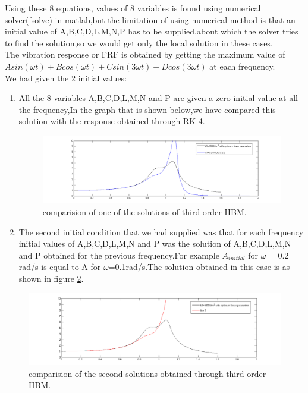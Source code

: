 Using these 8 equations, values of 8 variables is found using numerical solver(fsolve) in matlab,but the limitation of using numerical method is that an initial value of A,B,C,D,L,M,N,P has to be supplied,about which the solver tries to find the solution,so we would get only the local solution in these cases.\\
The vibration response or FRF is obtained by getting the maximum value of $Asin(\omega t)+Bcos(\omega t)+Csin(3\omega t)+Dcos(3\omega t) $ at each frequency.\\
We had given the 2 initial values:
\begin{enumerate}[1)]
\item All the 8 variables A,B,C,D,L,M,N and P are given a zero initial value at all the frequency,In the graph that is shown below,we have compared this solution with the response obtained through RK-4.

\begin{figure}[h!]
\includegraphics[width=\textwidth,height=0.5\textwidth]{"figures/nonlinearity_primaryymass_3rdorder_2"}
\caption{ comparision of one of the solutions of third order HBM.}
  \label{fig:hbm}
\end{figure}

\item The second initial condition that we had supplied was that for each frequency initial values of A,B,C,D,L,M,N and P was the solution of A,B,C,D,L,M,N and P obtained for the previous frequency.For example $A_{initial}$ for $\omega$ = 0.2 rad/s is equal to A for $\omega$=0.1rad/s.The solution obtained in this case is as shown in figure \ref{fig:hbm}.
\end{enumerate}
\begin{figure}[t]
\includegraphics[width=\textwidth,height=0.5\textwidth]{"figures/nonlinearity_primaryymass_3rdorder"}
\caption{ comparision  of the second solutions obtained through third order HBM.}
  \label{fig:hbm}
\end{figure}
